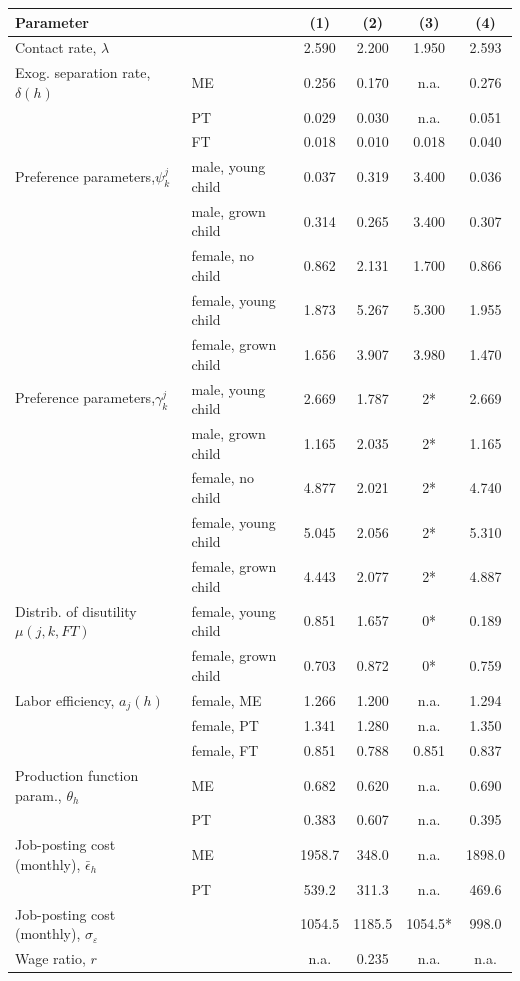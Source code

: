  \begin{tabular}{llcccc} \hline \hline
  Parameter  &     &  (1) & (2) & (3) & (4) \\ 
  \hline  
Contact rate, $\lambda$  &&       2.590 & 2.200  & 1.950 & 2.593 \\
Exog. separation rate, $\delta(h)$ &ME &       0.256 & 0.170 & n.a. & 0.276 \\
						 &PT &       0.029 & 0.030& n.a. & 0.051\\
						 &FT &       0.018 &0.010&0.018 &0.040\\
Preference parameters,$\psi_k^j$ &male, young child &       0.037 &0.319&3.400 &0.036\\
	&male, grown child &       0.314 &0.265&3.400 &0.307\\
	&female, no child &       0.862 &2.131&1.700 &0.866\\
	&female, young child &       1.873 &5.267&5.300 &1.955\\
	&female, grown child &       1.656 &3.907&3.980 &1.470\\
Preference parameters,$\gamma_k^j$ &male, young child &       2.669&1.787&2* &2.669\\
	&male, grown child &       1.165&2.035 &2* &1.165 \\
	&female, no child &       4.877&2.021 &2* &4.740 \\
	&female, young child &       5.045&2.056&2* &5.310\\
	&female, grown child &       4.443 &2.077&2* &4.887\\
Distrib. of disutility $\mu(j,k,FT)$ &female, young child &       0.851&1.657 &0* &0.189 \\
&female, grown child &       0.703&0.872&0* &0.759\\
Labor efficiency, $a_j(h)$ &female, ME &       1.266&1.200&n.a. &1.294\\
						   &female, PT &       1.341 &1.280 &n.a. &1.350 \\
						   &female, FT &       0.851&0.788 &0.851 &0.837 \\
Production function param., $\theta_h$  &ME &       0.682 &0.620&n.a. &0.690\\
										 &PT &       0.383&0.607&n.a. &0.395\\
Job-posting cost  (monthly), $\bar{\epsilon}_h  $ &ME &      1958.7&348.0&n.a. &1898.0\\
										 &PT &       539.2 &311.3&n.a. &469.6\\
Job-posting cost (monthly), $\sigma_\varepsilon  $   & &      1054.5 &1185.5&1054.5* &998.0\\
Wage ratio, $r$ &  &n.a. & 0.235 & n.a. & n.a. \\
\hline\hline 
\end{tabular} 
